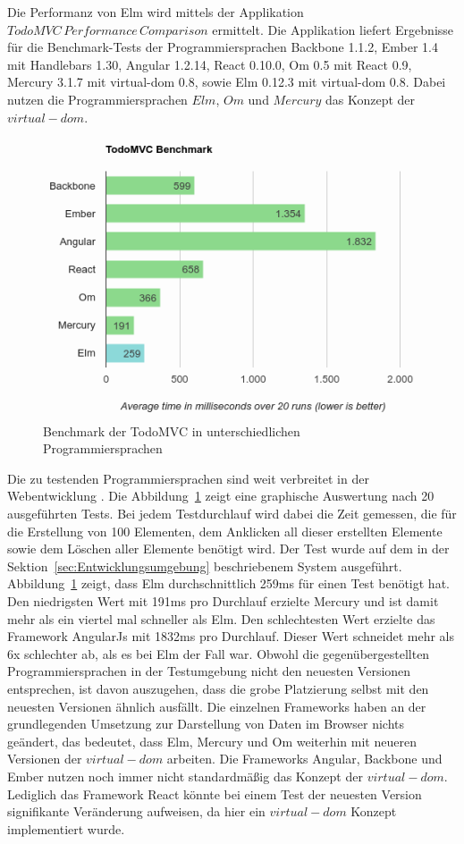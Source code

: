 Die Performanz von Elm wird mittels der Applikation $TodoMVC\,Performance\,Comparison$ ermittelt. Die Applikation liefert Ergebnisse für die Benchmark-Tests der Programmiersprachen Backbone 1.1.2, Ember 1.4 mit Handlebars 1.30, Angular 1.2.14, React 0.10.0, Om 0.5 mit React 0.9, Mercury 3.1.7 mit virtual-dom 0.8, sowie Elm 0.12.3 mit virtual-dom 0.8. Dabei nutzen die Programmiersprachen $Elm$, $Om$ und $Mercury$ das Konzept der $virtual-dom$.
\begin{figure}[ht]
\centering
\includegraphics[scale=0.6]{img/elm-benchmark-final.png}
\caption{Benchmark der TodoMVC in unterschiedlichen Programmiersprachen}\label{fig:elm-todo-benchmarks}
\end{figure}
Die zu testenden Programmiersprachen sind weit verbreitet in der Webentwicklung \cite[Vgl.]{most-used-frameworks}. Die Abbildung~\ref{fig:elm-todo-benchmarks} zeigt eine graphische Auswertung nach 20 ausgeführten Tests. Bei jedem Testdurchlauf wird dabei die Zeit gemessen, die für die Erstellung von 100 Elementen, dem Anklicken all dieser erstellten Elemente sowie dem Löschen aller Elemente benötigt wird. Der Test wurde auf dem in der Sektion~\ref{sec:Entwicklungsumgebung} beschriebenem System ausgeführt. Abbildung~\ref{fig:elm-todo-benchmarks} zeigt, dass Elm durchschnittlich 259ms für einen Test benötigt hat. Den niedrigsten Wert mit 191ms pro Durchlauf erzielte Mercury und ist damit mehr als ein viertel mal schneller als Elm. Den schlechtesten Wert erzielte das Framework AngularJs mit 1832ms pro Durchlauf. Dieser Wert schneidet mehr als 6x schlechter ab, als es bei Elm der Fall war.
Obwohl die gegenübergestellten Programmiersprachen in der Testumgebung nicht den neuesten Versionen entsprechen, ist davon auszugehen, dass die grobe Platzierung selbst mit den neuesten Versionen ähnlich ausfällt. Die einzelnen Frameworks haben an der grundlegenden Umsetzung zur Darstellung von Daten im Browser nichts geändert, das bedeutet, dass Elm, Mercury und Om weiterhin mit neueren Versionen der $virtual-dom$ arbeiten. Die Frameworks Angular, Backbone und Ember nutzen noch immer nicht standardmäßig das Konzept der $virtual-dom$. Lediglich das Framework React könnte bei einem Test der neuesten Version signifikante Veränderung aufweisen, da hier ein $virtual-dom$ Konzept implementiert wurde.
